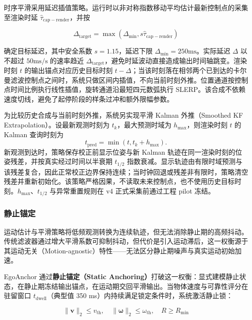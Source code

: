 \documentclass[review]{vgtc}
\begin{document}
时序平滑采用延迟插值策略。运行时以非对称指数移动平均估计最新控制点的采集至渲染时延 $\widehat{\tau}_{\mathrm{cap-render}}$，并按

\begin{equation}
\Delta_{\mathrm{target}} = \max\!\left(\Delta_{\mathrm{min}}, s \widehat{\tau}_{\mathrm{cap-render}}\right)
\label{eq:adaptive-delay}
\end{equation}


确定目标延迟，其中安全系数 $s = 1.15$，延迟下限 $\Delta_{\mathrm{min}} = 250 \mathrm{ms}$。实际延迟 $\Delta$ 以不超过 $50 \mathrm{ms}/\mathrm{s}$ 的速率趋近 $\Delta_{\mathrm{target}}$，避免时延波动直接造成输出时间轴跳变。渲染时刻 $t$ 的输出锚点对应历史目标时刻 $t - \Delta$；当该时刻落在相邻两个已到达的卡尔曼滤波控制点之间时，系统只做区间内插值，不向当前时刻外推。位置通道按控制点时间比例执行线性插值，旋转通道沿最短四元数弧执行 SLERP。该合成不依赖速度切线，避免了起停阶段的样条过冲和额外限幅参数。

为比较历史合成与当前时刻外推，系统另实现平滑 Kalman 外推（Smoothed KF Extrapolation）。设最新观测时刻为 $t_k$，最大预测时域为 $h_{\max}$，则渲染时刻 $t$ 的 Kalman 查询时刻为
\begin{equation}
t_{\mathrm{pred}}=\min(t,t_k+h_{\max}).
\label{eq:smoothed-kf-extrapolation-horizon}
\end{equation}
新观测到达时，策略保存校正前显示位姿与新 Kalman 轨迹在同一渲染时刻的位姿残差，并按真实经过时间以半衰期 $t_{1/2}$ 指数衰减。显示轨迹由有限时域预测与该残差复合，因此正常校正边界保持连续；当时钟回退或残差非有限时，策略清空残差并重新初始化。该策略严格因果，不读取未来控制点，也不使用历史目标时刻。$h_{\max}$、$t_{1/2}$ 与异常重置规则在 v4 正式采集前通过工程 pilot 冻结。

\subsubsection{静止锚定}\label{sec:staticlock}


运动估计与平滑策略将低频观测转换为连续轨迹，但无法消除静止期的高频抖动。传统滤波器通过增大平滑系数可抑制抖动，但代价是引入运动滞后，这一权衡源于其运动无关（Motion-agnostic）特性------无法区分静止期噪声与真实运动初始加速。

EgoAnchor 通过\textbf{静止锚定（Static Anchoring）}打破这一权衡：显式建模静止状态，在静止期冻结输出锚点，在运动期交回平滑输出。当物体速度与可靠性评分在驻留窗口 $t_{\mathrm{dwell}}$（典型值 350 ms）内持续满足锁定条件时，系统激活静止锁：

\begin{equation}
\lVert \mathbf{v} \rVert_2 \leq v_{\mathrm{th}}, \quad \lVert \mathbf{\omega} \rVert_2 \leq \omega_{\mathrm{th}}, \quad R \geq R_{\mathrm{min}}
\label{eq:lock-condition}
\end{equation}
\end{document}
